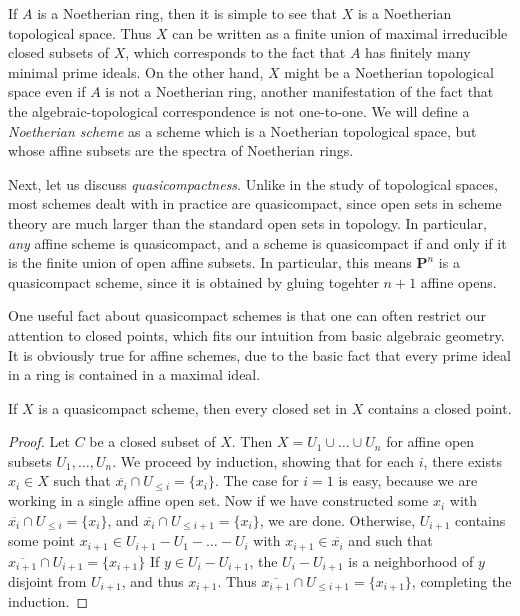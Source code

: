 If $A$ is a Noetherian ring, then it is simple to see that $X$ is a Noetherian topological space. Thus $X$ can be written as a finite union of maximal irreducible closed subsets of $X$, which corresponds to the fact that $A$ has finitely many minimal prime ideals. On the other hand, $X$ might be a Noetherian topological space even if $A$ is not a Noetherian ring, another manifestation of the fact that the algebraic-topological correspondence is not one-to-one. We will define a \emph{Noetherian scheme} as a scheme which is a Noetherian topological space, but whose affine subsets are the spectra of Noetherian rings.

Next, let us discuss \emph{quasicompactness}. Unlike in the study of topological spaces, most schemes dealt with in practice are quasicompact, since open sets in scheme theory are much larger than the standard open sets in topology. In particular, \emph{any} affine scheme is quasicompact, and a scheme is quasicompact if and only if it is the finite union of open affine subsets. In particular, this means $\mathbf{P}^n$ is a quasicompact scheme, since it is obtained by gluing togehter $n+1$ affine opens.

One useful fact about quasicompact schemes is that one can often restrict our attention to closed points, which fits our intuition from basic algebraic geometry. It is obviously true for affine schemes, due to the basic fact that every prime ideal in a ring is contained in a maximal ideal.

\begin{theorem}
    If $X$ is a quasicompact scheme, then every closed set in $X$ contains a closed point.
\end{theorem}
\begin{proof}
    Let $C$ be a closed subset of $X$. Then $X = U_1 \cup \dots \cup U_n$ for affine open subsets $U_1,\dots,U_n$. We proceed by induction, showing that for each $i$, there exists $x_i \in X$ such that $\overline{x_i} \cap U_{\leq i} = \{ x_i \}$. The case for $i = 1$ is easy, because we are working in a single affine open set. Now if we have constructed some $x_i$ with $\overline{x_i} \cap U_{\leq i} = \{ x_i \}$, and $\overline{x_i} \cap U_{\leq i+1} = \{ x_i \}$, we are done. Otherwise, $U_{i+1}$ contains some point $x_{i+1} \in U_{i+1} - U_1 - \dots - U_i$ with $x_{i+1} \in \overline{x_i}$ and such that $\overline{x_{i+1}} \cap U_{i+1} = \{ x_{i+1} \}$ If $y \in U_i - U_{i+1}$, the $U_i - U_{i+1}$ is a neighborhood of $y$ disjoint from $U_{i+1}$, and thus $x_{i+1}$. Thus $\overline{x_{i+1}} \cap U_{\leq i+1} = \{ x_{i+1} \}$, completing the induction.
\end{proof}

